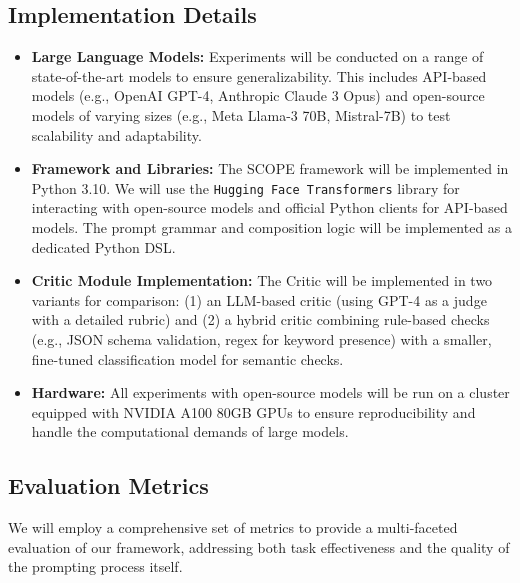 \documentclass{article}
\begin{document}
\subsection{Implementation Details}
\begin{itemize}
    \item \textbf{Large Language Models:} Experiments will be conducted on a range of state-of-the-art models to ensure generalizability. This includes API-based models (e.g., OpenAI GPT-4, Anthropic Claude 3 Opus) and open-source models of varying sizes (e.g., Meta Llama-3 70B, Mistral-7B) to test scalability and adaptability.
    \item \textbf{Framework and Libraries:} The SCOPE framework will be implemented in Python 3.10. We will use the \texttt{Hugging Face Transformers} library for interacting with open-source models and official Python clients for API-based models. The prompt grammar and composition logic will be implemented as a dedicated Python DSL.
    \item \textbf{Critic Module Implementation:} The Critic will be implemented in two variants for comparison: (1) an LLM-based critic (using GPT-4 as a judge with a detailed rubric) and (2) a hybrid critic combining rule-based checks (e.g., JSON schema validation, regex for keyword presence) with a smaller, fine-tuned classification model for semantic checks.
    \item \textbf{Hardware:} All experiments with open-source models will be run on a cluster equipped with NVIDIA A100 80GB GPUs to ensure reproducibility and handle the computational demands of large models.
\end{itemize}

\subsection{Evaluation Metrics}
We will employ a comprehensive set of metrics to provide a multi-faceted evaluation of our framework, addressing both task effectiveness and the quality of the prompting process itself.
\end{document}
